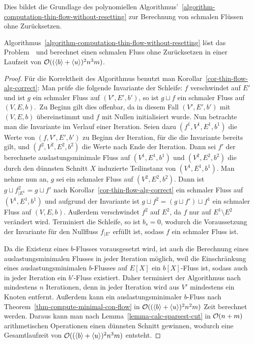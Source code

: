 Dies bildet die Grundlage des polynomiellen Algorithmus'~\ref{algorithm-computation-thin-flow-without-resetting} zur Berechnung von schmalen Flüssen ohne Zurücksetzen.

\begin{theorem}
		Algorithmus~\ref{algorithm-computation-thin-flow-without-resetting} löst das Problem~\probTFwoR\ und berechnet einen schmalen Fluss ohne Zurücksetzen in einer Laufzeit von $\mathcal{O}((\langle b\rangle + \langle u\rangle)^2 n^3 m)$.
\end{theorem}
\begin{proof}
	Für die Korrektheit des Algorithmus benutzt man Korollar~\ref{cor-thin-flow-alg-correct}:
	Man prüfe die folgende Invariante der Schleife:
	\glqq $f$ verschwindet auf $E'$ und ist $g$ ein schmaler Fluss auf $(V',E',b')$, so ist $g \sqcup f$ ein schmaler Fluss auf $(V, E, b)$.\grqq\ 
	Zu Beginn gilt dies offenbar, da in diesem Fall $(V', E', b')$ mit $(V, E, b)$ übereinstimmt und $f$ mit Nullen initialisiert wurde.
	Nun betrachte man die Invariante im Verlauf einer Iteration.
	Seien dazu $(f^1, V^1, E^1, b^1)$ die Werte von $(f, V', E', b')$ zu Beginn der Iteration, für die die Invariante bereits gilt, und $(f^2, V^2, E^2, b^2)$ die Werte nach Ende der Iteration.
	Dann sei $f'$ der berechnete auslastungsminimale Fluss auf $(V^1, E^1, b^1)$ und $(V^2, E^2, b^2)$ die durch den dünnsten Schnitt $X$ induzierte Teilinstanz von $(V^1, E^1, b^1)$.
	Man nehme nun an, $g$ sei ein schmaler Fluss auf $(V^2, E^2, b^2)$.
	Dann ist $g\sqcup f^2_{\mid E^1} = g \sqcup f'$ nach Korollar~\ref{cor-thin-flow-alg-correct} ein schmaler Fluss auf $(V^1, E^1, b^1)$ und aufgrund der Invariante ist $g \sqcup f^2 = (g \sqcup f') \sqcup f^1$ ein schmaler Fluss auf $(V, E, b)$.
	Außerdem verschwindet $f^2$ auf $E^2$, da $f$ nur auf $E^1\setminus E^2$ verändert wird.
	Terminiert die Schleife, so ist $b_s=0$, wodurch die Voraussetzung der Invariante
	für den Nullfluss $f_{\mid E'}$ erfüllt ist, sodass $f$ ein schmaler Fluss ist.
	
	Da die Existenz eines $b$-Flusses vorausgesetzt wird, ist auch die Berechnung eines auslastungsminimalen Flusses in jeder Iteration möglich, weil die Einschränkung eines auslastungsminimalen $b$-Flusses auf $E[X]$ ein $b[X]$-Fluss ist, sodass auch in jeder Iteration ein $b'$-Fluss existiert.
	Daher terminiert der Algorithmus nach mindestens $n$ Iterationen, denn in jeder Iteration wird aus $V'$ mindestens ein Knoten entfernt.
	Außerdem kann ein auslastungsminimaler $b$-Fluss nach Theorem~\ref{thm-compute-minimal-con-flow} in $\mathcal{O}((\langle b\rangle+\langle u\rangle)^2 n^2 m)$ Zeit berechnet werden.
	Daraus kann man nach Lemma~\ref{lemma-calc-sparsest-cut} in $\mathcal{O}(n+m)$ arithmetischen Operationen einen dünnsten Schnitt gewinnen, wodurch eine Gesamtlaufzeit von $\mathcal{O}((\langle b\rangle + \langle u\rangle)^2 n^3 m)$ entsteht.
\end{proof}

